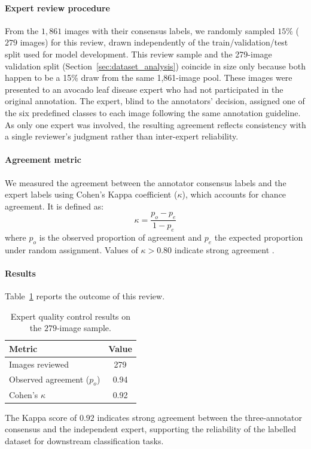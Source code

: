 \paragraph{Expert review procedure}
From the $1,861$ images with their consensus labels, we randomly sampled $15\%$ ($279$ images) for this review, drawn independently of the train/validation/test split used for model development. This review sample and the 279-image validation split (Section~\ref{sec:dataset_analysis}) coincide in size only because both happen to be a 15\% draw from the same 1,861-image pool. These images were presented to an avocado leaf disease expert who had not participated in the original annotation. The expert, blind to the annotators' decision, assigned one of the six predefined classes to each image following the same annotation guideline. As only one expert was involved, the resulting agreement reflects consistency with a single reviewer's judgment rather than inter-expert reliability.

\paragraph{Agreement metric}
We measured the agreement between the annotator consensus labels and the expert labels using Cohen's Kappa coefficient ($\kappa$), which accounts for chance agreement. It is defined as:
\begin{equation}
\kappa = \frac{p_o - p_e}{1 - p_e}
\end{equation}
where $p_o$ is the observed proportion of agreement and $p_e$ the expected proportion under random assignment. Values of $\kappa > 0.80$ indicate strong agreement \citep{landis1977measurement}.

\paragraph{Results}
Table~\ref{tab:quality_control} reports the outcome of this review.

\begin{table}[htbp]
\centering
\caption{Expert quality control results on the $279$‑image sample.}
\label{tab:quality_control}
\small
\setlength{\tabcolsep}{5pt}
\begin{tabular}{l c}
\toprule
\textbf{Metric} & \textbf{Value} \\
\midrule
Images reviewed            & 279 \\
Observed agreement ($p_o$) & 0.94 \\
Cohen's $\kappa$           & 0.92 \\
\bottomrule
\end{tabular}
\end{table}

The Kappa score of $0.92$ indicates strong agreement between the three-annotator consensus and the independent expert, supporting the reliability of the labelled dataset for downstream classification tasks.